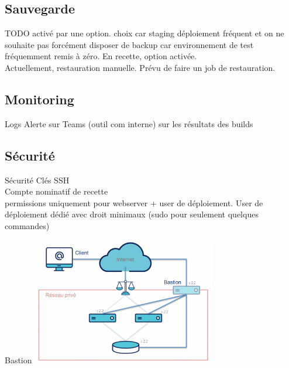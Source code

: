 \subsection{Sauvegarde}
\begin{frame}{\subsecname}
	TODO activé par une option. choix car staging déploiement fréquent et on ne souhaite pas forcément disposer de backup car environnement de test fréquemment remis à zéro. En recette, option activée. \\ 
	
	Actuellement, restauration manuelle. Prévu de faire un job de restauration.
\end{frame}

\subsection{Monitoring}
\begin{frame}{\subsecname}
	Logs
	Alerte sur Teams (outil com interne) sur les résultats des builds
\end{frame}

\subsection{Sécurité}
\begin{frame}{Sécurité}
	Clés SSH  \\
	Compte nominatif de recette \\
	permissions uniquement pour webserver + user de déploiement. 
	User de déploiement dédié avec droit minimaux (sudo pour seulement quelques commandes)
\end{frame}

\begin{frame}{Bastion}
	\centering \includegraphics[width=0.60\textwidth]{img/bastion.png}
\end{frame}
